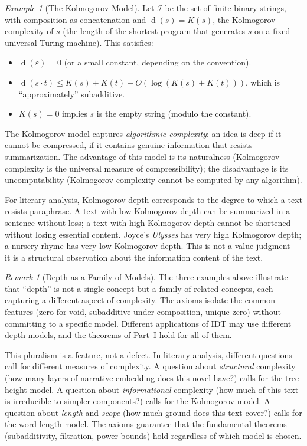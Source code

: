 \documentclass[11pt,openany]{book}
\theoremstyle{definition}
\theoremstyle{plain}
\theoremstyle{remark}
\newtheorem{remark}[axiom]{Remark}
\newtheorem{example}[axiom]{Example}
\newcommand{\IS}{\mathcal{I}}               %
\newcommand{\depth}{\operatorname{d}}       %
\begin{document}
\begin{example}[The Kolmogorov Model]
Let $\IS$ be the set of finite binary strings, with composition as concatenation and $\depth(s) = K(s)$, the Kolmogorov complexity of $s$ (the length of the shortest program that generates $s$ on a fixed universal Turing machine). This satisfies:
\begin{itemize}
\item $\depth(\varepsilon) = 0$ (or a small constant, depending on the convention).
\item $\depth(s \cdot t) \leq K(s) + K(t) + O(\log(K(s) + K(t)))$, which is ``approximately'' subadditive.
\item $K(s) = 0$ implies $s$ is the empty string (modulo the constant).
\end{itemize}
The Kolmogorov model captures \emph{algorithmic complexity}: an idea is deep if it cannot be compressed, if it contains genuine information that resists summarization. The advantage of this model is its naturalness (Kolmogorov complexity is the universal measure of compressibility); the disadvantage is its uncomputability (Kolmogorov complexity cannot be computed by any algorithm).

For literary analysis, Kolmogorov depth corresponds to the degree to which a text resists paraphrase. A text with low Kolmogorov depth can be summarized in a sentence without loss; a text with high Kolmogorov depth cannot be shortened without losing essential content. Joyce's \emph{Ulysses} has very high Kolmogorov depth; a nursery rhyme has very low Kolmogorov depth. This is not a value judgment---it is a structural observation about the information content of the text.
\end{example}

\begin{remark}[Depth as a Family of Models]
The three examples above illustrate that ``depth'' is not a single concept but a family of related concepts, each capturing a different aspect of complexity. The axioms isolate the common features (zero for void, subadditive under composition, unique zero) without committing to a specific model. Different applications of IDT may use different depth models, and the theorems of Part~I hold for all of them.

This pluralism is a feature, not a defect. In literary analysis, different questions call for different measures of complexity. A question about \emph{structural} complexity (how many layers of narrative embedding does this novel have?) calls for the tree-height model. A question about \emph{informational} complexity (how much of this text is irreducible to simpler components?) calls for the Kolmogorov model. A question about \emph{length} and \emph{scope} (how much ground does this text cover?) calls for the word-length model. The axioms guarantee that the fundamental theorems (subadditivity, filtration, power bounds) hold regardless of which model is chosen.
\end{remark}
\end{document}
